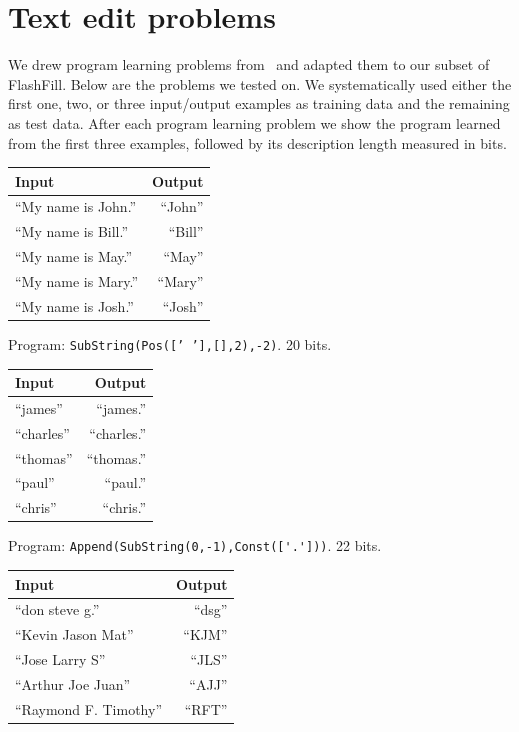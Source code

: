 \documentclass{article}
\begin{document}
  \section{Text edit problems}
  We drew program learning problems
  from~\cite{DBLP:conf/ecai/LinDETM14} and adapted them to our subset
  of FlashFill. Below are the problems we tested on. We systematically
  used either the first one, two, or three input/output examples 
  as training data and the remaining as test data.
  After each program learning problem we show the program learned from the first three examples,
  followed by its description length measured in bits.
  
\centering\begin{tabular}{l|r}
      Input & Output \\\hline
``My name is John.''& ``John''\\
 ``My name is Bill.''& ``Bill''\\
 ``My name is May.''& ``May''\\
 ``My name is Mary.'' &``Mary''\\
 ``My name is Josh.''& ``Josh''
\end{tabular}

Program: \texttt{SubString(Pos([' '],[],2),-2)}. 20 bits.
\vspace{1cm}  
  

\begin{tabular}{l|r}
  Input & Output \\\hline
  ``james'' &``james.''\\
  ``charles'' & ``charles.''\\
  ``thomas'' & ``thomas.''\\
  ``paul'' & ``paul.''\\
  ``chris'' & ``chris.''
\end{tabular}

Program: \verb|Append(SubString(0,-1),Const(['.']))|. 22 bits.
	 \vspace{1cm}


\begin{tabular}{l|r}
  Input & Output \\\hline
  ``don steve g.'' &``dsg''\\
  ``Kevin Jason Mat'' &``KJM''\\
  ``Jose Larry S'' &``JLS''\\
  ``Arthur Joe Juan'' &``AJJ''\\
  ``Raymond F. Timothy'' &``RFT''
\end{tabular}
\end{document}
